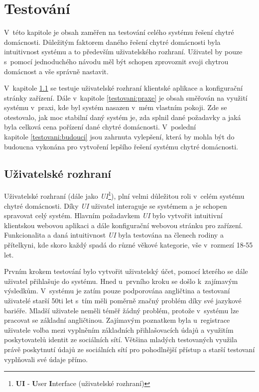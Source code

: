 \chapter{Testování}
\label{testovani}
V~této kapitole je obsah zaměřen na testování celého systému řešení chytré domácnosti.
Důležitým faktorem daného řešení chytré domácnosti byla intuitivnost systému a to především uživatelského rozhraní.
Uživatel by pouze s~pomocí jednoduchého návodu měl být schopen zprovoznit svoji chytrou domácnost a vše správně nastavit.

V~kapitole \ref{testovani:UI} se testuje uživatelské rozhraní klientské aplikace a konfigurační stránky zařízení.
Dále v~kapitole \ref{testovani:praxe} je obsah směřován na využití systému v~praxi, kde byl systém nasazen v~mém vlastním pokoji.
Zde se otestovalo, jak moc stabilní daný systém je, zda splnil dané požadavky a jaká byla celková cena pořízení dané chytré domácnosti.
V~poslední \\ kapitole \ref{testovani:budouci} jsou zahrnuta vylepšení, která by mohla být do budoucna vykonána pro vytvoření lepšího řešení systému chytré domácnosti.

\section{Uživatelské rozhraní}
\label{testovani:UI}
Uživatelské rozhraní (dále jako \emph{UI}\footnote{\textbf{UI} - \textbf{U}ser \textbf{I}nterface (uživatelské rozhraní)}), plní velmi důležitou roli v~celém systému chytré domácnosti.
Díky \emph{UI} uživatel interaguje se systémem a je schopen spravovat celý systém.
Hlavním požadavkem \emph{UI} bylo vytvořit intuitivní klientskou webovou aplikaci a dále konfigurační webovou stránku pro zařízení.
Funkcionalita a daná intuitivnost \emph{UI} byla testována na členech rodiny a přítelkyni, kde skoro každý spadá do různé věkové kategorie, vše v~rozmezí 18-55 let.

Prvním krokem testování bylo vytvořit uživatelský účet, pomocí kterého se dále uživatel přihlašuje do systému.
Hned u~prvního kroku se došlo k~zajímavým výsledkům.
V~systému je zatím pouze podporována angličtina a testovaní uživatelé starší 50ti let s~tím měli poměrně značný problém díky své jazykové bariéře.
Mladší uživatele neměli téměř žádný problém, protože v~systému lze pracovat se základní angličtinou.
Zajímavým poznatkem byla u~registrace uživatele volba mezi vyplněním základních přihlašovacích údajů a využitím poskytovatelů identit ze sociálních sítí.
Většina mladých testovaných využila právě poskytnutí údajů ze sociálních sítí pro pohodlnější přístup a starší testovaní vyplňovali své údaje přímo.

